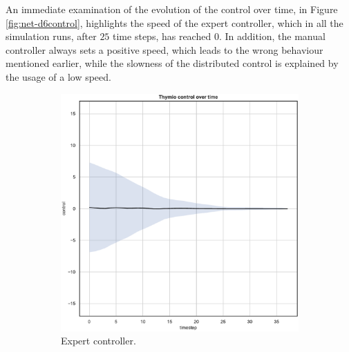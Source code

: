 An immediate examination of the evolution of the control over time, in Figure 
\ref{fig:net-d6control}, highlights the speed of the expert controller, which in all 
the simulation runs, after $25$ time steps, has reached 0. 
In addition, the manual controller always sets a positive speed, which leads to the 
wrong behaviour mentioned earlier, while the slowness of the distributed 
control is explained by the usage of a low speed.
\begin{figure}[!htb]
	\centering
	\begin{subfigure}[h]{0.3\textwidth}
		\centering
		\includegraphics[width=\textwidth]{contents/images/net-d6/control-overtime-omniscient}%
		\caption{Expert controller.}
	\end{subfigure}
	\hfill
	\begin{subfigure}[h]{0.3\textwidth}
		\centering

\end{subfigure}
\end{figure}
